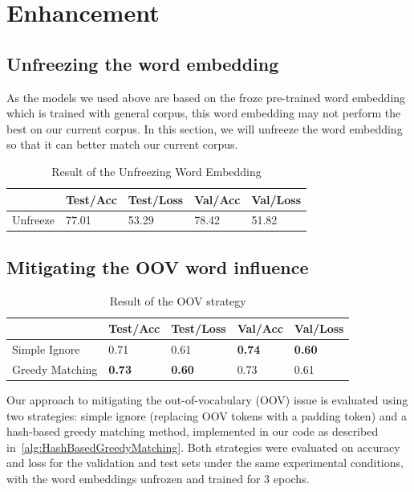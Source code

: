 \section{Enhancement}
\subsection{Unfreezing the word embedding}

As the models we used above are based on the froze pre-trained word embedding which is trained with general corpus, this word embedding may not perform the best on our current corpus. In this section, we will unfreeze the word embedding so that it can better match our current corpus.

\begin{table}[h]
\centering
\caption{Result of the Unfreezing Word Embedding}
\label{tab:unfreeze}
\begin{tabular}{l|llll}
\toprule
                & Test/Acc      & Test/Loss     & Val/Acc       & Val/Loss      \\
\midrule
Unfreeze &  77.01 & 53.29 & 78.42 & 51.82
\end{tabular}
\end{table}

\subsection{Mitigating the OOV word influence}

\begin{table}[h]
\centering
\caption{Result of the OOV strategy}
\label{tab:oov}
\begin{tabular}{l|llll}
\toprule
                & Test/Acc      & Test/Loss     & Val/Acc       & Val/Loss      \\
\midrule
Simple Ignore   & 0.71          & 0.61          & \textbf{0.74} & \textbf{0.60} \\
Greedy Matching & \textbf{0.73} & \textbf{0.60} & 0.73          & 0.61         
\end{tabular}
\end{table}

Our approach to mitigating the out-of-vocabulary (OOV) issue is evaluated using two strategies: simple ignore (replacing OOV tokens with a padding token) and a hash-based greedy matching method, implemented in our code as described in~\cref{alg:HashBasedGreedyMatching}. Both strategies were evaluated on accuracy and loss for the validation and test sets under the same experimental conditions, with the word embeddings unfrozen and trained for 3 epochs.

